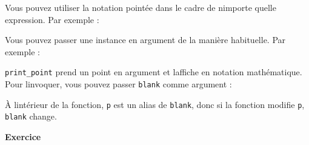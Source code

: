 Vous pouvez utiliser la notation pointée dans le cadre de
n\textquotesingle importe quelle expression. Par exemple :

\begin{Shaded}
\begin{Highlighting}[]
\OperatorTok{\textgreater{}\textgreater{}\textgreater{}}  \StringTok{\textquotesingle{}(}\StringTok{, }\StringTok{)\textquotesingle{}} \OperatorTok{\%}
\NormalTok{(}\NormalTok{, }\NormalTok{)}
\OperatorTok{\textgreater{}\textgreater{}\textgreater{}}\OperatorTok{=}\OperatorTok{**} \OperatorTok{+}\OperatorTok{**}\NormalTok{)}
\OperatorTok{\textgreater{}\textgreater{}\textgreater{}} 
\end{Highlighting}
\end{Shaded}

Vous pouvez passer une instance en argument de la manière habituelle.
Par exemple :

\begin{Shaded}
\begin{Highlighting}[]
     \StringTok{\textquotesingle{}(}\StringTok{, }\StringTok{)\textquotesingle{}} \OperatorTok{\%}
\end{Highlighting}
\end{Shaded}

\texttt{print\_point} prend un point en argument et
l\textquotesingle affiche en notation mathématique. Pour
l\textquotesingle invoquer, vous pouvez passer \texttt{blank} comme
argument :

\begin{Shaded}
\begin{Highlighting}[]
\OperatorTok{\textgreater{}\textgreater{}\textgreater{}}
\NormalTok{(}\NormalTok{, }\NormalTok{)}
\end{Highlighting}
\end{Shaded}

À l\textquotesingle intérieur de la fonction, \texttt{p} est un alias de
\texttt{blank}, donc si la fonction modifie \texttt{p}, \texttt{blank}
change.

\textbf{Exercice}

